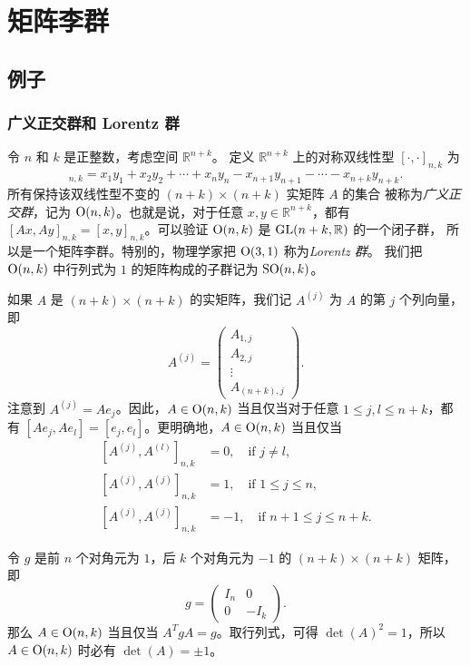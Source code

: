 \chapter{矩阵李群}

\section{例子}

\subsection{广义正交群和 Lorentz 群}

令 $n$ 和 $k$ 是正整数，考虑空间 $\mathbb{R}^{n+k}$。
定义 $\mathbb{R}^{n+k}$ 上的对称双线性型 $[\cdot,\cdot]_{n,k}$ 为 
\begin{equation}
  [x,y]_{n,k} = x_1y_1 + x_2y_2 + \cdots + x_ny_n - x_{n+1}y_{n+1} - \cdots - x_{n+k}y_{n+k}.
\end{equation}
所有保持该双线性型不变的 $(n+k)\times (n+k)$ 实矩阵 $A$ 的集合
被称为\emph{广义正交群}，记为 $\operatorname{O}(n,k)$。也就是说，对于任意 $x,y\in \mathbb{R}^{n+k}$，都有
$[Ax,Ay]_{n,k}=[x,y]_{n,k}$。可以验证 $\operatorname{O}(n,k)$ 是 $\operatorname{GL}(n+k,\mathbb{R})$ 的一个闭子群，
所以是一个矩阵李群。特别的，物理学家把 $\operatorname{O}(3,1)$ 称为\emph{Lorentz 群}。
我们把 $\operatorname{O}(n,k)$ 中行列式为 $1$ 的矩阵构成的子群记为 $\operatorname{SO}(n,k)$。

如果 $A$ 是 $(n+k)\times (n+k)$ 的实矩阵，我们记 $A^{(j)}$ 为 $A$ 的第 $j$
个列向量，即
\[
  A^{(j)}=\begin{pmatrix}
    A_{1,j} \\
    A_{2,j} \\
    \vdots \\
    A_{(n+k),j}
  \end{pmatrix}.
\]
注意到 $A^{(j)}=Ae_j$。因此，$A\in \operatorname{O}(n,k)$ 当且仅当对于任意 $1\leq j,l\leq n+k$，都有
$[Ae_j,Ae_l]=[e_j,e_l]$。更明确地，$A\in \operatorname{O}(n,k)$ 当且仅当
\begin{equation}
  \begin{aligned}
    [A^{(j)},A^{(l)}]_{n,k} & = 0, \quad \text{if } j\neq l, \\
    [A^{(j)},A^{(j)}]_{n,k} & = 1, \quad \text{if } 1\leq j\leq n, \\
    [A^{(j)},A^{(j)}]_{n,k} & = -1, \quad \text{if } n+1\leq j\leq n+k.
  \end{aligned}
\end{equation}

令 $g$ 是前 $n$ 个对角元为 $1$，后 $k$ 个对角元为 $-1$ 的 $(n+k)\times (n+k)$ 矩阵，
即
\[
  g=\begin{pmatrix}
    I_n & 0 \\
    0 & -I_k
  \end{pmatrix}.
\]
那么 $A\in \operatorname{O}(n,k)$ 当且仅当 $A^TgA=g$。取行列式，可得 $\det(A)^2=1$，所以
$A\in\operatorname{O}(n,k)$ 时必有 $\det(A)=\pm 1$。

